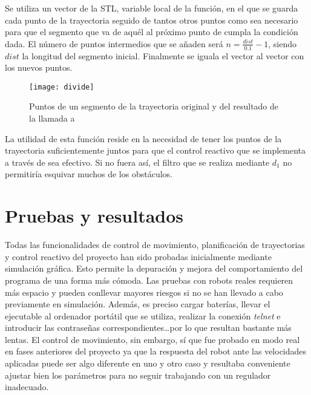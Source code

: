 \noindent
Se utiliza un vector de la STL, variable local de la función, en el que se guarda cada punto de la trayectoria seguido de tantos otros puntos como sea necesario para que el segmento que va de aquél al próximo punto de  cumpla la condición dada. El número de puntos intermedios que se añaden será $n = \frac{dist}{0.1} - 1$, siendo $dist$ la longitud del segmento inicial. Finalmente se iguala el vector  al vector con los nuevos puntos.

\begin{figure}[h]
  \centering\texttt{[image: divide]}\\
  \caption{Puntos de un segmento de la trayectoria original y del resultado de la llamada a }\label{fg:divide}
\end{figure}

\vspace{0.2cm}

\noindent
La utilidad de esta función reside en la necesidad de tener los puntos de la trayectoria suficientemente juntos para que el control reactivo que se implementa a través de  sea efectivo. Si no fuera así, el filtro que se realiza mediante $d_{1}$ no permitiría esquivar muchos de los obstáculos.

%
%
%


\section{Pruebas y resultados}
Todas las funcionalidades de control de movimiento, planificación de trayectorias y control reactivo del proyecto han sido probadas inicialmente mediante simulación gráfica. Esto permite la depuración y mejora del comportamiento del programa de una forma más cómoda. Las pruebas con robots reales requieren más espacio y pueden conllevar mayores riesgos si no se han llevado a cabo previamente en simulación. Además, es preciso cargar baterías, llevar el ejecutable al ordenador portátil que se utiliza, realizar la conexión \emph{telnet} e introducir las contraseñas correspondientes\ldots por lo que resultan bastante más lentas. El control de movimiento, sin embargo, sí que fue probado en modo real en fases anteriores del proyecto ya que la respuesta del robot ante las velocidades aplicadas puede ser algo diferente en uno y otro caso y resultaba conveniente ajustar bien los parámetros para no seguir trabajando con un regulador inadecuado.

